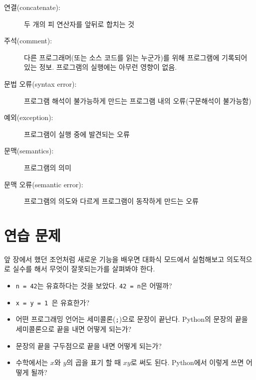 \documentclass[10pt]{book}
\begin{document}
\begin{description}
\item[연결(concatenate):]  두 개의 피 연산자를 앞뒤로 합치는 것

\item[주석(comment):] 다른 프로그래머(또는 소스 코드를 읽는 누군가)를
  위해 프로그램에 기록되어 있는 정보. 프로그램의 실행에는 아무런 영향이
  없음. 

\item[문법 오류(syntax error):] 프로그램 해석이 불가능하게 만드는
  프로그램 내의 오류(구문해석이 불가능함)

\item[예외(exception):] 프로그램이 실행 중에 발견되는 오류

\item[문맥(semantics):] 프로그램의 의미

\item[문맥 오류(semantic error):] 프로그램의 의도와 다르게 프로그램이
  동작하게 만드는 오류

\end{description}


\section{연습 문제}

\begin{exercise}

  앞 장에서 했던 조언처럼 새로운 기능을 배우면 대화식 모드에서
  실험해보고 의도적으로 실수를 해서 무엇이 잘못되는가를 살펴봐야 한다.

\begin{itemize}

\item  {\tt n = 42}는 유효하다는 것을 보았다. {\tt 42 = n}은 어떨까?

\item {\tt x = y = 1 }은 유효한가?

\item 어떤 프로그래밍 언어는 세미콜론({\tt ;})으로 문장이 끝난다.
  Python의 문장의 끝을 세미콜론으로 끝을 내면 어떻게 되는가?

\item 문장의 끝을 구두점으로 끝을 내면 어떻게 되는가?

\item 수학에서는 $x$와 $y$의 곱을 표기 할 때 $x y$로 써도 된다.  Python에서 이렇게 쓰면 어떻게 될까?

\end{itemize}

\end{exercise}
\end{document}
